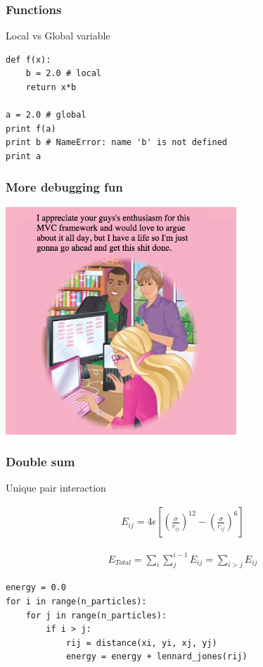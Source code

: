 \begin{frame}[fragile]

    \frametitle{Functions}

    Local vs Global variable

    \bigskip

\begin{lstlisting}
def f(x):
    b = 2.0 # local
    return x*b

a = 2.0 # global
print f(a)
print b # NameError: name 'b' is not defined
print a
\end{lstlisting}

\end{frame}


\begin{frame}[fragile]
    \frametitle{More debugging fun}
    \begin{center}
        \includegraphics[width=0.65\textwidth]{images/barbie3.png}
    \end{center}
\end{frame}


\begin{frame}[fragile]

    \frametitle{Double sum}

    Unique pair interaction

    \begin{align}
        E_{ij} = 4 \epsilon \left[ \left(\frac{\sigma}{r_{ij}} \right)^{12} - \left(\frac{\sigma}{r_{ij}} \right)^6 \right]
    \end{align}

    \begin{align}
        E_{Total} = \sum_i \sum_{j}^{i-1} E_{ij} = \sum_{i > j} E_{ij}
    \end{align}

\begin{lstlisting}
energy = 0.0
for i in range(n_particles):
    for j in range(n_particles):
        if i > j:
            rij = distance(xi, yi, xj, yj)
            energy = energy + lennard_jones(rij)
\end{lstlisting}

\end{frame}









